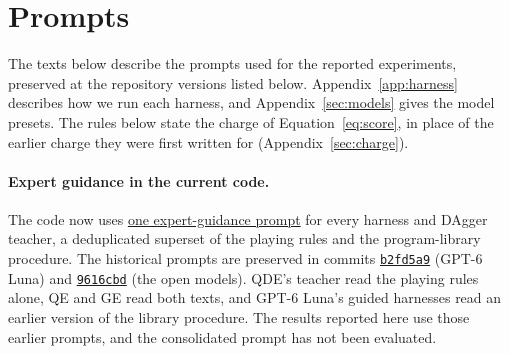 \section{Prompts}
\label{app:prompts}

The texts below describe the prompts used for the reported experiments, preserved at the repository versions listed below. Appendix~\ref{app:harness} describes how we run each harness, and Appendix~\ref{sec:models} gives the model presets. The rules below state the charge of Equation~\ref{eq:score}, in place of the earlier charge they were first written for (Appendix~\ref{sec:charge}).

\paragraph{Expert guidance in the current code.}
The code now uses \href{https://github.com/unifyai/continual-arc/blob/main/baselines/src/continual_arc_baselines/systems/guidance.py}{one expert-guidance prompt}{} for every harness and DAgger teacher, a deduplicated superset of the playing rules and the program-library procedure. The historical prompts are preserved in commits \href{https://github.com/unifyai/continual-arc/tree/b2fd5a94572fa83cde9ecd20b38d41d1548d64b9}{\texttt{b2fd5a9}} (GPT-6 Luna) and \href{https://github.com/unifyai/continual-arc/tree/9616cbd2c1d5741142ca7f2590ecb3535028daf9}{\texttt{9616cbd}} (the open models).  QDE's teacher read the playing rules alone, QE and GE read both texts, and GPT-6 Luna's guided harnesses read an earlier version of the library procedure. The results reported here use those earlier prompts, and the consolidated prompt has not been evaluated.


